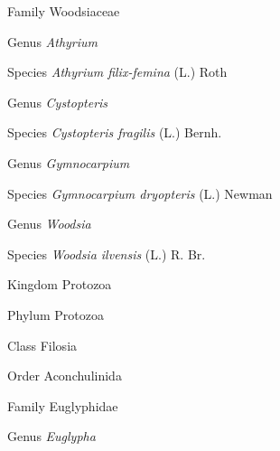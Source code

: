 \documentclass[9pt, article]{memoir}
\begin{document}
\begin{multicols}{2}
\vspace{6pt}\noindent\hspace{24pt}Family Woodsiaceae


\vspace{6pt}\noindent\hspace{30pt}Genus \textit{Athyrium}


\vspace{6pt}\noindent\hspace{36pt}Species \textit{Athyrium filix-femina} (L.) Roth


\vspace{6pt}\noindent\hspace{30pt}Genus \textit{Cystopteris}


\vspace{6pt}\noindent\hspace{36pt}Species \textit{Cystopteris fragilis} (L.) Bernh.


\vspace{6pt}\noindent\hspace{30pt}Genus \textit{Gymnocarpium}


\vspace{6pt}\noindent\hspace{36pt}Species \textit{Gymnocarpium dryopteris} (L.) Newman


\vspace{6pt}\noindent\hspace{30pt}Genus \textit{Woodsia}


\vspace{6pt}\noindent\hspace{36pt}Species \textit{Woodsia ilvensis} (L.) R. Br.


\vspace{6pt}\noindent\hspace{0pt}Kingdom Protozoa


\vspace{6pt}\noindent\hspace{6pt}Phylum Protozoa


\vspace{6pt}\noindent\hspace{12pt}Class Filosia


\vspace{6pt}\noindent\hspace{18pt}Order Aconchulinida


\vspace{6pt}\noindent\hspace{24pt}Family Euglyphidae


\vspace{6pt}\noindent\hspace{30pt}Genus \textit{Euglypha}



\end{multicols}
\end{document}

